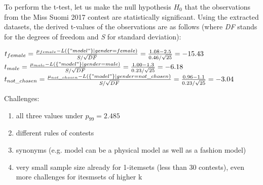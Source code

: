 To perform the t-test, let us make the null hypothesis \emph{$H_0$} that the observations from the Miss Suomi 2017 contest are statistically significant. Using the extracted datasets, the derived t-values of the observations are as follows (where \emph{DF} stands for the degrees of freedom and \emph{S} for standard deviation): 

\begin{center}
    $t_{female}=
        \frac{\mu_{female} - L(\{"model"\}|gender=female)}{S/\sqrt{DF}} = 
        \frac{1.08-2.5}{0.46/\sqrt{25}}=-15.43$ \\

    $t_{male}=
    \frac{\mu_{male} - L(\{"model"\}|gender=male)}{S/\sqrt{DF}} = 
    \frac{1.00-1.3}{0.23/\sqrt{25}}=-6.18$ \\

    $t_{not\_chosen}=
    \frac{\mu_{not\_chosen} - L(\{"model"\}|gender=not\_chosen)}{S/\sqrt{DF}}=
    \frac{0.96-1.1}{0.23/\sqrt{25}}=-3.04$
\end{center}

Challenges: 
\begin{enumerate}
    \item all three values under $p_{99} = 2.485$ 
    \item different rules of contests
    \item synonyms (e.g. model can be a physical model as well as a fashion model)
    \item very small sample size already for 1-itemsets (less than 30 contests), even more challenges for itesmsets of higher k
\end{enumerate}
